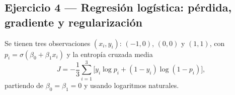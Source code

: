 \subsection{Ejercicio 4 --- Regresión logística: pérdida, gradiente y regularización}

Se tienen tres observaciones $(x_i,y_i)$: $(-1,0)$, $(0,0)$ y $(1,1)$,
con $p_i=\sigma(\beta_0+\beta_1x_i)$ y la entropía cruzada media
\[
    J = -\frac{1}{3}\sum_{i=1}^{3}\bigl[y_i\log p_i + (1-y_i)\log(1-p_i)\bigr],
\]
partiendo de $\beta_0=\beta_1=0$ y usando logaritmos naturales.


